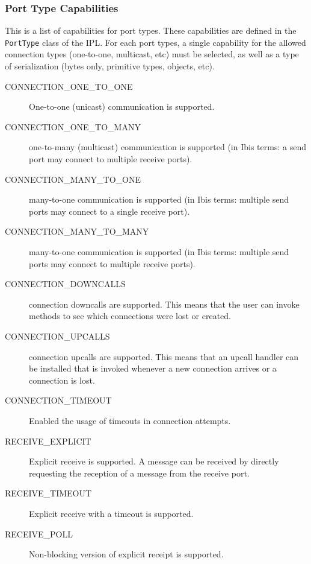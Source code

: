 \documentclass[10pt]{article}
\begin{document}
\subsubsection{Port Type Capabilities}

This is a list of capabilities for port types. These capabilities are
defined in the \texttt{PortType} class of the IPL.  For each port
types, a single capability for the allowed connection types (one-to-one,
multicast, etc) must be selected, as well as a type of
serialization (bytes only, primitive types, objects, etc). 

\begin{description}
\item[CONNECTION\_ONE\_TO\_ONE]
One-to-one (unicast) communication is supported.

\item[CONNECTION\_ONE\_TO\_MANY]
one-to-many (multicast) communication is supported
(in Ibis terms: a send port
may connect to multiple receive ports).

\item[CONNECTION\_MANY\_TO\_ONE]
many-to-one communication is supported (in Ibis terms: multiple
send ports may connect to a single receive port).

\item[CONNECTION\_MANY\_TO\_MANY]
many-to-one communication is supported (in Ibis terms: multiple
send ports may connect to multiple receive ports).

\item[CONNECTION\_DOWNCALLS]
connection downcalls are supported. This means that the user can
invoke methods to see which connections were lost or created.

\item[CONNECTION\_UPCALLS]
connection upcalls are supported. This means that an upcall handler can
be installed that is invoked whenever a new connection arrives or a
connection is lost.

\item[CONNECTION\_TIMEOUT]
Enabled the usage of timeouts in connection attempts.

\item[RECEIVE\_EXPLICIT]
Explicit receive is supported. A message can be received by directly
requesting the reception of a message from the receive port.

\item[RECEIVE\_TIMEOUT]
Explicit receive with a timeout is supported.

\item[RECEIVE\_POLL]
Non-blocking version of explicit receipt is supported.


\end{description}
\end{document}
